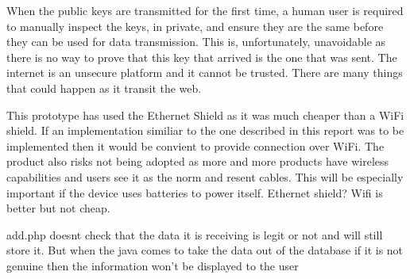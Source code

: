When the public keys are transmitted for the first time, a human user is required to manually inspect the keys, in private, and ensure they are the same before they can be used for data transmission. This is, unfortunately, unavoidable as there is no way to prove that this key that arrived is the one that was sent. The internet is an unsecure platform and it cannot be trusted. There are many things that could happen as it transit the web. 

This prototype has used the Ethernet Shield as it was much cheaper than a WiFi shield. If an implementation similiar to the one described in this report was to be implemented then it would be convient to provide connection over WiFi. The product also risks not being adopted as more and more products have wireless capabilities and  users see it as the norm and resent cables. This will be especially important if the device uses batteries to power itself.
Ethernet shield? Wifi is better but not cheap.


add.php doesnt check that the data it is receiving is legit or not and will still store it. But when the java comes to take the data out of the database if it is not genuine then the information won't be displayed to the user